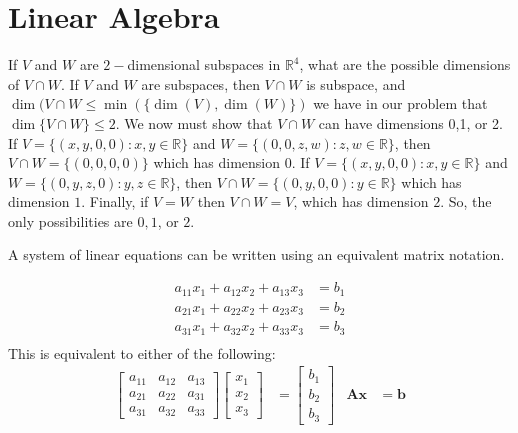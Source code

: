 \documentclass[crop=false,class=book,oneside]{standalone}
\begin{document}
    \section{Linear Algebra}
        \begin{lexample}
            If $V$ and $W$ are $2-$dimensional subspaces in
            $\mathbb{R}^{4}$, what are the possible dimensions of
            $V\cap W$. If $V$ and $W$ are subspaces, then
            ${V}\cap{W}$ is subspace, and
            $\dim({V}\cap{W}\leq\min(\{\dim(V),\dim(W)\})$
            we have in our problem that $\dim\{V\cap W\}\leq 2$. We
            now must show that $V\cap W$ can have dimensions 0,1, or
            2. If $V=\{(x,y,0,0):x,y\in\mathbb{R}\}$ and
            $W=\{(0,0,z,w):z,w\in \mathbb{R}\}$, then
            ${V}\cap{W}=\{(0,0,0,0)\}$ which has dimension $0$.
            If $V=\{(x,y,0,0):x,y\in\mathbb{R}\}$ and
            $W=\{(0,y,z,0):y,z\in\mathbb{R}\}$,
            then ${V}\cap{W}=\{(0,y,0,0):y\in\mathbb{R}\}$
            which has dimension $1$. Finally, if $V=W$ then
            ${V}\cap{W}=V$, which has dimension $2$. So, the only
            possibilities are $0,1$, or $2$.
        \end{lexample}
        A system of linear equations can be written
        using an equivalent matrix notation.
        \begin{example}
            \begin{align*}
                a_{11}x_{1}+a_{12}x_{2}+a_{13}x_{3}&=b_{1}\\
                a_{21}x_{1}+a_{22}x_{2}+a_{23}x_{3}&=b_{2}\\
                a_{31}x_{1}+a_{32}x_{2}+a_{33}x_{3}&=b_{3}\\
            \end{align*}
            This is equivalent to either of the following:
            \begin{align*}
                \begin{bmatrix}
                    a_{11}&a_{12}&a_{13}\\
                    a_{21}&a_{22}&a_{31}\\
                    a_{31}&a_{32}&a_{33}
                \end{bmatrix}
                \begin{bmatrix}
                    x_{1}\\
                    x_{2}\\
                    x_{3}
                \end{bmatrix}
                &=
                \begin{bmatrix}
                    b_{1}\\
                    b_{2}\\
                    b_{3}
                \end{bmatrix}
                &
                \mathbf{A}\mathbf{x}
                &=\mathbf{b}
            \end{align*}
        \end{example}
\end{document}
